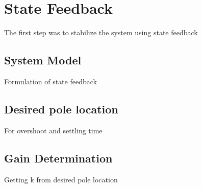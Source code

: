 \section{State Feedback}

The first step was to stabilize the system using state feedback

\subsection{System Model}

Formulation of state feedback

\subsection{Desired pole location}

For overshoot and settling time

\subsection{Gain Determination}

Getting k from desired pole location